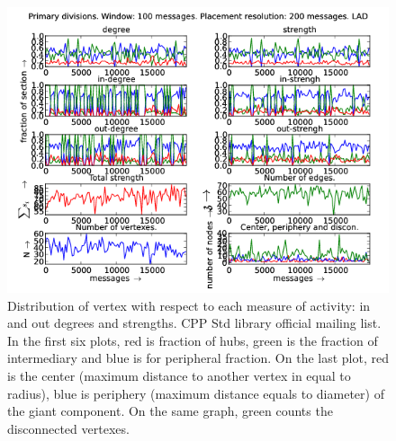 \documentclass[%
 aip,
 jmp,%
 amsmath,amssymb,
 reprint,%
]{revtex4-1}
\begin{document}
\begin{figure}[hbtp] 
   \centering
        \includegraphics[width=\textwidth]{figs/LAD/100}
    \caption{Distribution of vertex with respect to each measure of activity: in and out degrees and strengths. CPP Std library official mailing list. In the first six plots, red is fraction of hubs, green is the fraction of intermediary and blue is for peripheral fraction. On the last plot, red is the center (maximum distance to another vertex in equal to radius), blue is periphery (maximum distance equals to diameter) of the giant component. On the same graph, green counts the disconnected vertexes.}
    \label{fig:lad100}
\end{figure}
\end{document}
